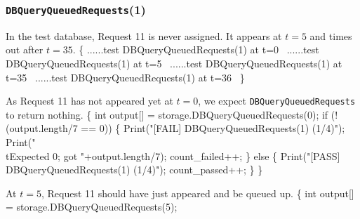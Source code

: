 \documentclass{article}
\def\nwendcode{\endtrivlist \endgroup}
\let\nwdocspar=\par
\theoremstyle{definition}
\begin{document}
\subsubsection{{\tt{}DBQueryQueuedRequests}(1)}
In the test database, Request 11 is never assigned. It appears
at $t=5$ and times out after $t=35$.
\nwenddocs{}\endmoddef{}
\{
  \LA{}......test \code{}DBQueryQueuedRequests\edoc{}(1) at t=0~{\nwtagstyle{}}\RA{}
  \LA{}......test \code{}DBQueryQueuedRequests\edoc{}(1) at t=5~{\nwtagstyle{}}\RA{}
  \LA{}......test \code{}DBQueryQueuedRequests\edoc{}(1) at t=35~{\nwtagstyle{}}\RA{}
  \LA{}......test \code{}DBQueryQueuedRequests\edoc{}(1) at t=36~{\nwtagstyle{}}\RA{}
\}
\nwendcode{}\nwdocspar
As Request 11 has not appeared yet at $t=0$, we expect
{\tt{}DBQueryQueuedRequests} to return nothing.
\nwenddocs{}\endmoddef{}
\{
  int output[] = storage.DBQueryQueuedRequests(0);
  if (!(output.length/7 == 0)) \{
    Print("[FAIL] DBQueryQueuedRequests(1) (1/4)");
    Print("\\tExpected 0; got "+output.length/7);
    count_failed++;
  \} else \{
    Print("[PASS] DBQueryQueuedRequests(1) (1/4)");
    count_passed++;
  \}
\}
\nwendcode{}\nwdocspar
At $t=5$, Request 11 should have just appeared and be queued up.
\nwenddocs{}\endmoddef{}
\{
  int output[] = storage.DBQueryQueuedRequests(5);
\end{document}

